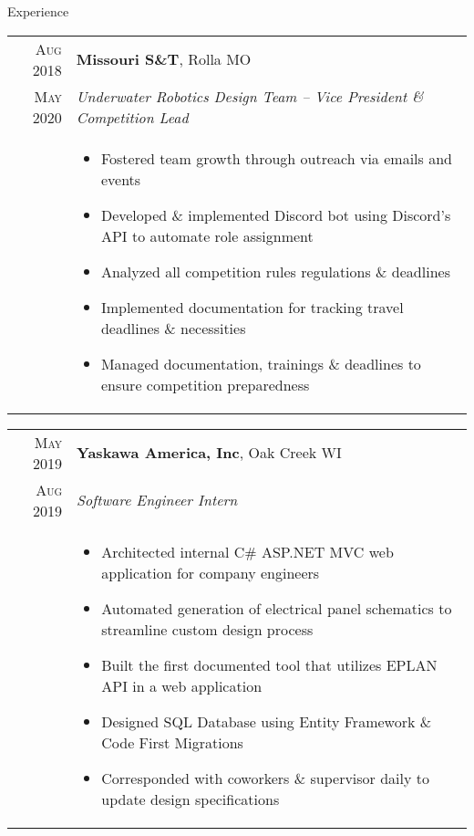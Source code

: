 \documentclass{resume}
\begin{document}
\begin{rSection}{Experience}
{    \begin{tabular}{r|p{15cm}}
      \textsc{Aug 2018} & \textbf{Missouri S\&T}, Rolla MO \\
      \textsc{May 2020}  & \textit{Underwater Robotics Design Team – Vice President \& Competition Lead} \\ &
      \begin{itemize}
        \item {Fostered team growth through outreach via emails and events }
        \item {Developed \& implemented Discord bot using Discord's API to automate role assignment}
        \item {Analyzed all competition rules regulations \& deadlines}
        \item {Implemented documentation for tracking travel deadlines \& necessities}
        \item {Managed documentation, trainings \& deadlines to ensure competition preparedness}
      \end{itemize}
    \end{tabular}

  \begin{tabular}{r|p{15cm}}
    \textsc{May 2019} & \textbf{Yaskawa America, Inc}, Oak Creek WI \\
    \textsc{Aug 2019}  & \textit{Software Engineer Intern} \\ &
    \begin{itemize}
        \item {Architected internal C\# ASP.NET MVC web application for company engineers}
        \item {Automated generation of electrical panel schematics to streamline custom design process}
        \item {Built the first documented tool that utilizes EPLAN API in a web application}
        \item {Designed SQL Database using Entity Framework \& Code First Migrations}
        \item {Corresponded with coworkers \& supervisor daily to update design specifications}
    \end{itemize}
  \end{tabular}
  
}
\end{rSection}
\end{document}
